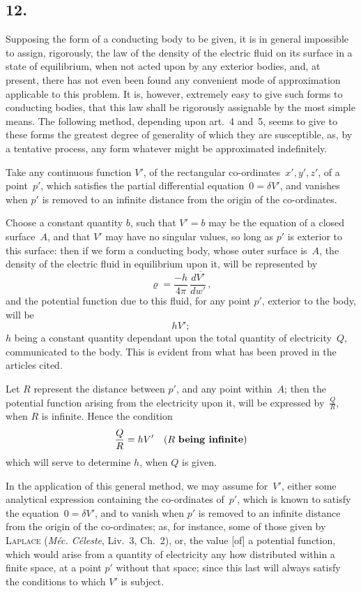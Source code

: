 \documentclass[12pt,notitlepage]{amsart}
\let\Person\textsc
\let\Emphasis\textbf
\let\Title\textit
\newcommand\Section[1]{\subsection{{#1}}}
\renewcommand{\rho}{\varrho}
\begin{document}
\Section{12.}
Supposing the form of a conducting body to be given, it is in general
impossible to assign, rigorously, the law of the density of the electric fluid
on its surface in a state of equilibrium, when not acted upon by any exterior
bodies, and, at present, there has not even been found any convenient mode
of approximation applicable to this problem. It is, however, extremely easy
to give such forms to conducting bodies, that this law shall be rigorously
assignable by the most simple means. The following method, depending upon
art.~4 and~5, seems to give to these forms the greatest degree of generality
of which they are susceptible, as, by a tentative process, any form whatever
might be approximated indefinitely.

Take any continuous function $V'$, of the rectangular
co-ordinates~$x',y',z'$,
of a point~$p'$,
which satisfies the partial differential equation~${0=\delta V'}$,
and vanishes when $p'$ is removed to an infinite distance from the origin of
the co-ordinates.

Choose a constant quantity $b$, such that $V'=b$ may be the equation
of a closed surface~$A$, and that $V'$ may have no singular values, so long as
$p'$ is exterior to this surface: then if we form a conducting body, whose
outer surface is~$A$, the density of the electric fluid in equilibrium upon it,
will be represented by
\[
\rho=\frac{-h}{4\pi}\,\frac{d\overline{V'}}{dw'}\,,
\]
and the potential function due to this fluid, for any point $p'$,
exterior to the body, will be
\[
hV';
\]
$h$ being a constant quantity dependant upon
the total quantity of electricity~$Q$,
communicated to the body. This is evident from what has been proved in
the articles cited.

Let $R$ represent the distance between $p'$, and any point within~$A$;
then the potential function arising from the electricity upon it, will be 
expressed by~$\frac{Q}{R}$, when $R$ is infinite. Hence the condition
\[
\frac QR=hV'\quad\text{($R$ \Emphasis{being infinite})}
\]
which will serve to determine $h$, when $Q$ is given.

In the application of this general method, we may assume for~$V'$,
either some analytical expression containing the co-ordinates of~$p'$, which is
known to satisfy the equation~${0=\delta V'}$,
and to vanish when $p'$ is removed
to an infinite distance from the origin of the co-ordinates; as, for instance,
some of those given by \Person{Laplace}
(\Title{M\'ec. C\'eleste}, Liv.~3, Ch.~2), or, the value
[of] a potential function,
which would arise from a quantity of electricity any how
distributed within a finite space,
at a point $p'$ without that space; since this
last will always satisfy the conditions to which $V'$ is subject.
\end{document}
